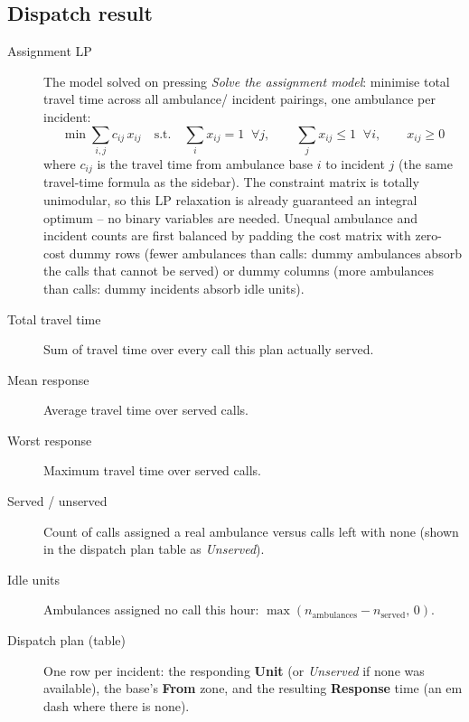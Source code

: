 \documentclass[11pt]{article}
\begin{document}
\subsection{Dispatch result}
\begin{description}
  \item[Assignment LP] The model solved on pressing \emph{Solve the
    assignment model}: minimise total travel time across all ambulance/
    incident pairings, one ambulance per incident:
    \[
      \min \sum_{i,j} c_{ij}\,x_{ij}
      \quad\text{s.t.}\quad
      \sum_i x_{ij} = 1 \;\;\forall j, \qquad
      \sum_j x_{ij} \le 1 \;\;\forall i, \qquad
      x_{ij} \ge 0
    \]
    where $c_{ij}$ is the travel time from ambulance base $i$ to incident
    $j$ (the same travel-time formula as the sidebar). The constraint matrix
    is totally unimodular, so this LP relaxation is already guaranteed an
    integral optimum -- no binary variables are needed. Unequal ambulance and
    incident counts are first balanced by padding the cost matrix with
    zero-cost dummy rows (fewer ambulances than calls: dummy ambulances
    absorb the calls that cannot be served) or dummy columns (more ambulances
    than calls: dummy incidents absorb idle units).
  \item[Total travel time] Sum of travel time over every call this plan
    actually served.
  \item[Mean response] Average travel time over served calls.
  \item[Worst response] Maximum travel time over served calls.
  \item[Served / unserved] Count of calls assigned a real ambulance versus
    calls left with none (shown in the dispatch plan table as
    \emph{Unserved}).
  \item[Idle units] Ambulances assigned no call this hour:
    $\max(n_{\text{ambulances}} - n_{\text{served}},\,0)$.
  \item[Dispatch plan (table)] One row per incident: the responding
    \textbf{Unit} (or \emph{Unserved} if none was available), the base's
    \textbf{From} zone, and the resulting \textbf{Response} time (an em dash
    where there is none).
\end{description}
\end{document}

